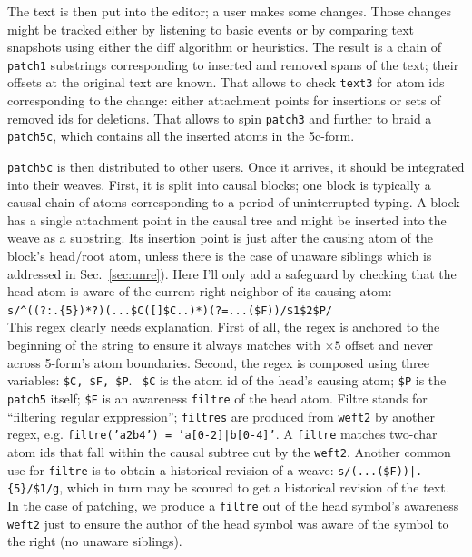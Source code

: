 \documentclass{acm_proc_article-sp}
\begin{document}
The text is then put into the editor; a user makes some changes.
Those changes might be tracked either by listening to  basic events or by comparing text snapshots using either the diff algorithm or heuristics.
The result is a chain of {\tt patch1} substrings corresponding to inserted and removed spans of the text; their offsets at the original text are known.
That allows to check {\tt text3} for atom ids corresponding to the change: either attachment points for insertions or sets of removed ids for deletions.
That allows to spin {\tt patch3} and further to braid a {\tt patch5c}, which contains all the inserted atoms in the 5c-form. 

{\tt patch5c} is then distributed to other users. Once it arrives, it should be integrated into their weaves.
First, it is split into causal blocks; one block is typically a causal chain of atoms corresponding to a period of uninterrupted typing.
A block has a single attachment point in the causal tree and might be inserted into the weave as a substring.
Its insertion point is just after the causing atom of the block's head/root atom, unless there is the case of unaware siblings which is addressed in Sec.~\ref{sec:unre}). Here I'll only add a safeguard by checking that the head atom is aware of the current right neighbor of its causing atom: \\
{\small \verb`s/^((?:.{5})*?)(...$C([`\bsp\cnc\verb`]$C..)*)(?=...($F))/$1$2$P/`}\\
This regex clearly needs explanation.
First of all, the regex is anchored to the beginning of the string to ensure it always matches with $\times 5$ offset and never across 5-form's atom boundaries.
Second, the regex is composed using three variables: \verb+$C, $F, $P+.
~\verb+$C+ is the atom id of the head's causing atom; \verb+$P+ is the {\tt patch5} itself; \verb+$F+ is an awareness {\tt filtre} of the head atom.
Filtre stands for ``filtering regular exppression''; {\tt filtres} are produced from {\tt weft2} by another regex, e.g. {\tt filtre('a2b4') = 'a[0-2]|b[0-4]'}.
A {\tt filtre} matches two-char atom ids that fall within the causal subtree cut by the {\tt weft2}.
Another common use for {\tt filtre} is to obtain a historical revision of a weave:  {\small \verb`s/(...($F))|.{5}/$1/g`}, which in turn may be scoured to get a historical revision of the text.
In the case of patching, we produce a {\tt filtre} out of the head symbol's awareness {\tt weft2} just to ensure the author of the head symbol was aware of the symbol to the right (no unaware siblings).
\end{document}
